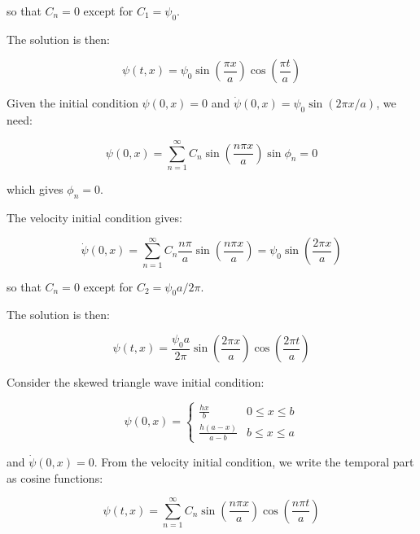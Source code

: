 \documentclass[12pt]{article}
\begin{document}
so that $C_{n} = 0$ except for $C_{1} = \psi_{0}$.

The solution is then:

\begin{equation}
    \psi(t, x) = \psi_{0} \sin{\left( \frac{\pi x}{a} \right)} \cos{\left( \frac{\pi t}{a} \right)}
\end{equation}

Given the initial condition $\psi(0, x) = 0$ and $\dot{\psi}(0, x) = \psi_{0} \sin{(2\pi x/a)}$, we need:

\begin{equation}
    \psi(0, x) = \sum_{n = 1}^{\infty} C_{n} \sin{\left( \frac{n \pi x}{a} \right)} \sin{\phi_{n}} = 0
\end{equation}

which gives $\phi_{n} = 0$.

The velocity initial condition gives:

\begin{equation}
    \dot{\psi}(0, x) = \sum_{n = 1}^{\infty} C_{n} \frac{n \pi}{a} \sin{\left( \frac{n \pi x}{a} \right)} = \psi_{0} \sin{\left( \frac{2 \pi x}{a} \right)}
\end{equation}

so that $C_{n} = 0$ except for $C_{2} = \psi_{0}a/2\pi$.

The solution is then:

\begin{equation}
    \psi(t, x) = \frac{\psi_{0} a}{2\pi} \sin{\left( \frac{2 \pi x}{a} \right)} \cos{\left( \frac{2 \pi t}{a} \right)}
\end{equation}

Consider the skewed triangle wave initial condition:

\begin{equation}
    \psi(0, x) = \begin{cases}
        \frac{hx}{b}       & 0 \leq x \leq b \\
        \frac{h(a-x)}{a-b} & b \leq x \leq a
    \end{cases}
\end{equation}

and $\dot{\psi}(0, x) = 0$. From the velocity initial condition, we write the temporal part as cosine functions:

\begin{equation}
    \psi(t, x) = \sum_{n = 1}^{\infty} C_{n} \sin{\left( \frac{n \pi x}{a} \right)} \cos{\left( \frac{n \pi t}{a} \right)}
\end{equation}
\end{document}
